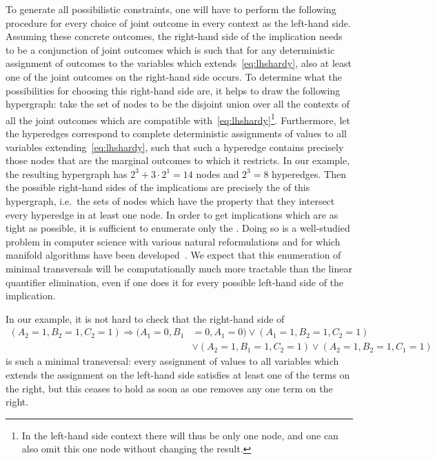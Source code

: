 To generate all possibilistic constraints, one will have to perform the following procedure for every choice of joint outcome in every context as the left-hand side. Assuming these concrete outcomes, the right-hand side of the implication needs to be a conjunction of joint outcomes which is such that for any deterministic assignment of outcomes to the variables which extends~\cref{eq:lhshardy}, also at least one of the joint outcomes on the right-hand side occurs. To determine what the possibilities for choosing this right-hand side are, it helps to draw the following hypergraph: take the set of nodes to be the disjoint union over all the contexts of all the joint outcomes which are compatible with~\eqref{eq:lhshardy}\footnote{In the left-hand side context there will thus be only one node, and one can also omit this one node without changing the result.}. Furthermore, let the hyperedges correspond to complete deterministic assignments of values to all variables extending~\cref{eq:lhshardy}, such that such a hyperedge contains precisely those nodes that are the marginal outcomes to which it restricts. In our example, the resulting hypergraph has $2^3 + 3\cdot 2^1 = 14$ nodes and $2^3 = 8$ hyperedges. Then the possible right-hand sides of the implications are precisely the  of this hypergraph, i.e.~the sets of nodes which have the property that they intersect every hyperedge in at least one node. In order to get implications which are as tight as possible, it is sufficient to enumerate only the . Doing so is a well-studied problem in computer science with various natural reformulations and for which manifold algorithms have been developed~\cite{eiter_dualization_2008}. We expect that this enumeration of minimal transversals will be computationally much more tractable than the linear quantifier elimination, even if one does it for every possible left-hand side of the implication.

In our example, it is not hard to check that the right-hand side of
\begin{align*}
	(A_2 = 1, B_2 = 1, C_2 = 1) \Longrightarrow (A_1 = 0, B_1 & = 0, A_1 = 0) \lor (A_1 = 1, B_2 = 1, C_2 = 1) \\
		& \lor (A_2 = 1, B_1 = 1, C_2 = 1) \lor (A_2 = 1, B_2 = 1, C_1 = 1)
\end{align*}
is such a minimal transversal: every assignment of values to all variables which extends the assignment on the left-hand side satisfies at least one of the terms on the right, but this ceases to hold as soon as one removes any one term on the right.


